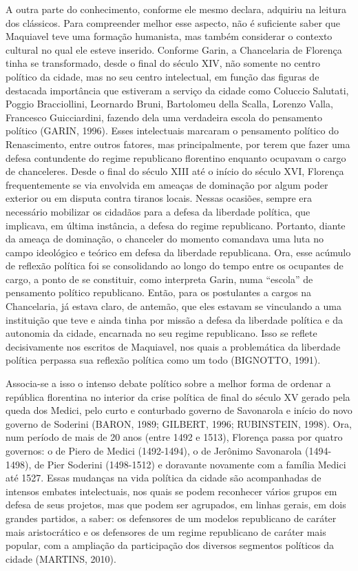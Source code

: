 A outra parte do conhecimento, conforme ele mesmo declara, adquiriu na
leitura dos clássicos. Para compreender melhor esse aspecto, não é
suficiente saber que Maquiavel teve uma formação humanista, mas também
considerar o contexto cultural no qual ele esteve inserido. Conforme
Garin, a Chancelaria de Florença tinha se transformado, desde o final do
século XIV, não somente no centro político da cidade, mas no seu centro
intelectual, em função das figuras de destacada importância que
estiveram a serviço da cidade como Coluccio Salutati, Poggio
Bracciollini, Leornardo Bruni, Bartolomeu della Scalla, Lorenzo Valla,
Francesco Guicciardini, fazendo dela uma verdadeira escola do pensamento
político (GARIN, 1996). Esses intelectuais marcaram o pensamento
político do Renascimento, entre outros fatores, mas principalmente, por
terem que fazer uma defesa contundente do regime republicano florentino
enquanto ocupavam o cargo de chanceleres. Desde o final do século XIII
até o início do século XVI, Florença frequentemente se via envolvida em
ameaças de dominação por algum poder exterior ou em disputa contra
tiranos locais. Nessas ocasiões, sempre era necessário mobilizar os
cidadãos para a defesa da liberdade política, que implicava, em última
instância, a defesa do regime republicano. Portanto, diante da ameaça de
dominação, o chanceler do momento comandava uma luta no campo ideológico
e teórico em defesa da liberdade republicana. Ora, esse acúmulo de
reflexão política foi se consolidando ao longo do tempo entre os
ocupantes de cargo, a ponto de se constituir, como interpreta Garin,
numa ``escola'' de pensamento político republicano. Então, para os
postulantes a cargos na Chancelaria, já estava claro, de antemão, que
eles estavam se vinculando a uma instituição que teve e ainda tinha por
missão a defesa da liberdade política e da autonomia da cidade,
encarnada no seu regime republicano. Isso se reflete decisivamente nos
escritos de Maquiavel, nos quais a problemática da liberdade política
perpassa sua reflexão política como um todo (BIGNOTTO, 1991).

Associa-se a isso o intenso debate político sobre a melhor forma de
ordenar a república florentina no interior da crise política de final do
século XV gerado pela queda dos Medici, pelo curto e conturbado governo
de Savonarola e início do novo governo de Soderini (BARON, 1989;
GILBERT, 1996; RUBINSTEIN, 1998). Ora, num período de mais de 20 anos
(entre 1492 e 1513), Florença passa por quatro governos: o de Piero de
Medici (1492-1494), o de Jerônimo Savonarola (1494-1498), de Pier
Soderini (1498-1512) e doravante novamente com a família Medici até
1527. Essas mudanças na vida política da cidade são acompanhadas de
intensos embates intelectuais, nos quais se podem reconhecer vários
grupos em defesa de seus projetos, mas que podem ser agrupados, em
linhas gerais, em dois grandes partidos, a saber: os defensores de um
modelos republicano de caráter mais aristocrático e os defensores de um
regime republicano de caráter mais popular, com a ampliação da
participação dos diversos segmentos políticos da cidade (MARTINS, 2010).

